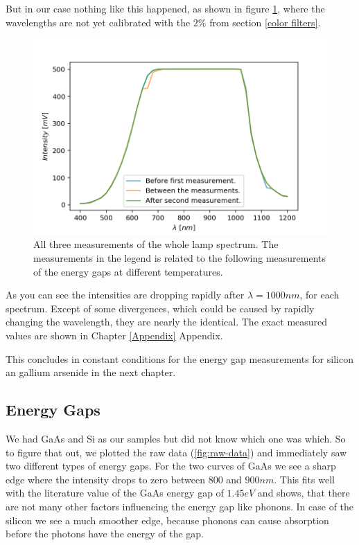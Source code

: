 \documentclass[]{article}
\begin{document}
But in our case nothing like this happened, as shown in figure \ref{fig:lamp spectra}, where the wavelengths are not yet calibrated with the $2\%$ from section \ref{color filters}.

\begin{figure}[H]
\centering
\includegraphics[width=.8\textwidth]{Plots/All-Lamp-Spectra.png}
\caption{All three measurements of the whole lamp spectrum. The measurements in the legend is related to the following measurements of the energy gaps at different temperatures.}
\label{fig:lamp spectra}
\end{figure} 

As you can see the intensities are dropping rapidly after  $\lambda =1000nm$, for each spectrum. Except of some divergences, which could be caused by rapidly changing the wavelength, they are nearly the identical. The exact measured values are shown in Chapter \ref{Appendix} Appendix.

This concludes in constant conditions for the energy gap measurements for silicon an gallium arsenide in the next chapter.

\subsection{Energy Gaps}
We had GaAs and Si as our samples but did not know which one was which. So to figure that out, we plotted the raw data (\ref{fig:raw-data}) and immediately saw two different types of energy gaps. For the two curves of GaAs we see a sharp edge where the intensity drops to zero between $800$ and $900nm$. This fits well with the literature value of the GaAs energy gap of $1.45eV$ and shows, that there are not many other factors influencing the energy gap like phonons. In case of the silicon we see a much smoother edge, because phonons can cause absorption before the photons have the energy of the gap.
\end{document}
